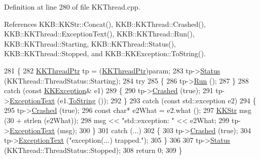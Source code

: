Definition at line 280 of file K\+K\+Thread.\+cpp.



References K\+K\+B\+::\+K\+K\+Str\+::\+Concat(), K\+K\+B\+::\+K\+K\+Thread\+::\+Crashed(), K\+K\+B\+::\+K\+K\+Thread\+::\+Exception\+Text(), K\+K\+B\+::\+K\+K\+Thread\+::\+Run(), K\+K\+B\+::\+K\+K\+Thread\+::\+Starting, K\+K\+B\+::\+K\+K\+Thread\+::\+Status(), K\+K\+B\+::\+K\+K\+Thread\+::\+Stopped, and K\+K\+B\+::\+K\+K\+Exception\+::\+To\+String().


\begin{DoxyCode}
281   \{
282     \hyperlink{class_k_k_b_1_1_k_k_thread}{KKThreadPtr}  tp = (\hyperlink{namespace_k_k_b_a777246973c170048c5d7aca8a7df3e42}{KKThreadPtr})param;
283     tp->\hyperlink{class_k_k_b_1_1_k_k_thread_a8b6636f59306caf89c24d9f756293d71}{Status} (KKThread::ThreadStatus::Starting);
284     \textcolor{keywordflow}{try}  
285     \{
286       tp->\hyperlink{class_k_k_b_1_1_k_k_thread_a4ecfa3856e1b5bb4a5a125fdc05c4e67}{Run} ();
287     \}
288     \textcolor{keywordflow}{catch}  (\textcolor{keyword}{const} \hyperlink{class_k_k_b_1_1_k_k_exception}{KKException}&  e1)
289     \{
290       tp->\hyperlink{class_k_k_b_1_1_k_k_thread_a1cc302487fe9e7fe79e7e6b056d3e7d1}{Crashed} (\textcolor{keyword}{true});
291       tp->\hyperlink{class_k_k_b_1_1_k_k_thread_a28ce636186cfdc8914248e0a087d7b0d}{ExceptionText} (e1.\hyperlink{class_k_k_b_1_1_k_k_exception_a9d565e887e90968c5e306c1ea94c6894}{ToString} ());
292     \}
293     \textcolor{keywordflow}{catch}  (\textcolor{keyword}{const} std::exception e2)
294     \{
295       tp->\hyperlink{class_k_k_b_1_1_k_k_thread_a1cc302487fe9e7fe79e7e6b056d3e7d1}{Crashed} (\textcolor{keyword}{true});
296       \textcolor{keyword}{const} \textcolor{keywordtype}{char}* e2What = e2.what ();
297       \hyperlink{class_k_k_b_1_1_k_k_str}{KKStr}  msg (30 + strlen (e2What));
298       msg << \textcolor{stringliteral}{"std::exception: "} << e2What;
299       tp->\hyperlink{class_k_k_b_1_1_k_k_thread_a28ce636186cfdc8914248e0a087d7b0d}{ExceptionText} (msg);
300     \}
301     \textcolor{keywordflow}{catch}  (...)
302     \{
303       tp->\hyperlink{class_k_k_b_1_1_k_k_thread_a1cc302487fe9e7fe79e7e6b056d3e7d1}{Crashed} (\textcolor{keyword}{true});
304       tp->\hyperlink{class_k_k_b_1_1_k_k_thread_a28ce636186cfdc8914248e0a087d7b0d}{ExceptionText} (\textcolor{stringliteral}{"exception(...) trapped."});
305     \}
306 
307     tp->\hyperlink{class_k_k_b_1_1_k_k_thread_a8b6636f59306caf89c24d9f756293d71}{Status} (KKThread::ThreadStatus::Stopped);
308     \textcolor{keywordflow}{return} 0;
309   \}
\end{DoxyCode}
